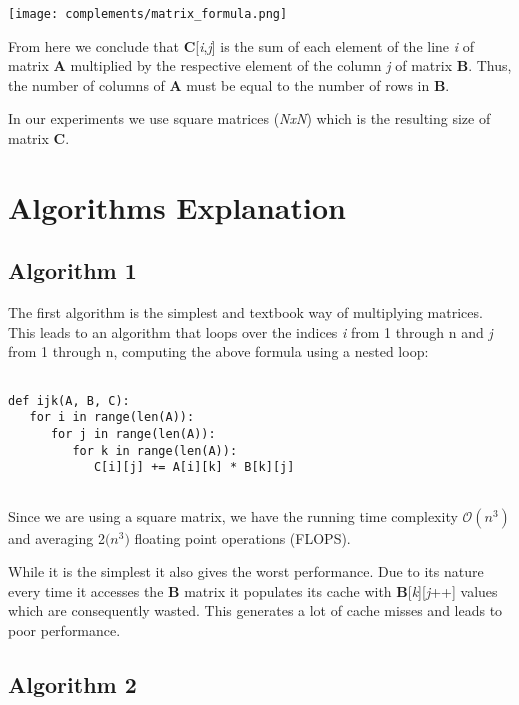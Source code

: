 \documentclass[a4paper]{article}
\begin{document}
\begin{center}
    \texttt{[image: complements/matrix\_formula.png]}\linebreak
\end{center}

From here we conclude that \textbf{C}[\textit{i},\textit{j}] is the sum of each element of the line \textit{i} of matrix \textbf{A} multiplied by the respective element of the column \textit{j} of matrix \textbf{B}. Thus, the number of columns of \textbf{A} must be equal to the number of rows in \textbf{B}.

In our experiments we use square matrices (\textit{NxN}) which is the resulting size of matrix \textbf{C}.

\section{Algorithms Explanation}



\subsection{Algorithm 1}

The first algorithm is the simplest and textbook way of multiplying matrices. This leads to an algorithm that loops over the indices \textit{i} from 1 through n and \textit{j} from 1 through n, computing the above formula using a nested loop:

\begin{lstlisting}

def ijk(A, B, C):
   for i in range(len(A)):
      for j in range(len(A)):
         for k in range(len(A)):
			C[i][j] += A[i][k] * B[k][j]
				
\end{lstlisting}

Since we are using a square matrix, we have the running time complexity $\mathcal{O}(n^{3})$ and averaging 2$\mathcal(n^{3})$ floating point operations (FLOPS).

While it is the simplest it also gives the worst performance. Due to its nature every time it accesses the \textbf{B} matrix it populates its cache with \textbf{B}[\textit{k}][\textit{j}++] values which are consequently wasted. This generates a lot of cache misses and leads to poor performance.

\subsection{Algorithm 2}
\end{document}
